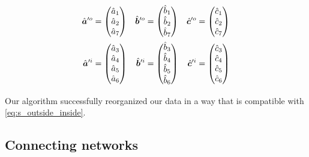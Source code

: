 \begin{equation}
    \begin{aligned}
        \hat{\bm{a}}'^o &= \begin{pmatrix}\hat{a}_1\\\hat{a}_2\\\hat{a}_7\end{pmatrix}
        &
        \hat{\bm{b}}'^o &= \begin{pmatrix}\hat{b}_1\\\hat{b}_2\\\hat{b}_7\end{pmatrix}
        &
        \hat{\bm{c}}'^o &= \begin{pmatrix}\hat{c}_1\\\hat{c}_2\\\hat{c}_7\end{pmatrix}
        \\
        \hat{\bm{a}}'^i &= \begin{pmatrix}\hat{a}_3\\\hat{a}_4\\\hat{a}_5\\\hat{a}_6\end{pmatrix}
        &
        \hat{\bm{b}}'^i &= \begin{pmatrix}\hat{b}_3\\\hat{b}_4\\\hat{b}_5\\\hat{b}_6\end{pmatrix}
        &
        \hat{\bm{c}}'^i &= \begin{pmatrix}\hat{c}_3\\\hat{c}_4\\\hat{c}_5\\\hat{c}_6\end{pmatrix}
    \end{aligned}
    \label{eq:qa_qb_qc_decomposed}
\end{equation}

Our algorithm successfully reorganized our data in a way that is compatible with \cref{eq:s_outside_inside}.



\subsection{Connecting networks}

